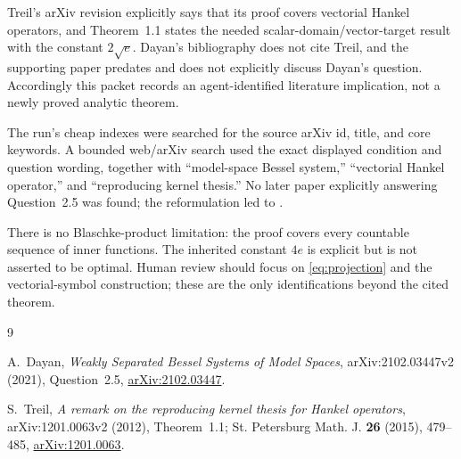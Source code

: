 \documentclass[11pt]{article}
\begin{document}
Treil's arXiv revision explicitly says that its proof covers vectorial Hankel
operators, and Theorem~1.1 states the needed scalar-domain/vector-target
result with the constant \(2\sqrt e\).  Dayan's bibliography does not cite
Treil, and the supporting paper predates and does not explicitly discuss
Dayan's question.  Accordingly this packet records an agent-identified
literature implication, not a newly proved analytic theorem.

The run's cheap indexes were searched for the source arXiv id, title, and core
keywords.  A bounded web/arXiv search used the exact displayed condition and
question wording, together with ``model-space Bessel system,'' ``vectorial
Hankel operator,'' and ``reproducing kernel thesis.''  No later paper explicitly
answering Question~2.5 was found; the reformulation led to \cite{Treil}.

There is no Blaschke-product limitation: the proof covers every countable
sequence of inner functions.  The inherited constant \(4e\) is explicit but
is not asserted to be optimal.  Human review should focus on
\eqref{eq:projection} and the vectorial-symbol construction; these are the only
identifications beyond the cited theorem.

\begin{thebibliography}{9}

A.~Dayan,
\emph{Weakly Separated Bessel Systems of Model Spaces},
arXiv:2102.03447v2 (2021), Question~2.5,
\href{https://arxiv.org/abs/2102.03447}{arXiv:2102.03447}.

S.~Treil,
\emph{A remark on the reproducing kernel thesis for Hankel operators},
arXiv:1201.0063v2 (2012), Theorem~1.1;
St. Petersburg Math. J. \textbf{26} (2015), 479--485,
\href{https://arxiv.org/abs/1201.0063}{arXiv:1201.0063}.

\end{thebibliography}
\end{document}
